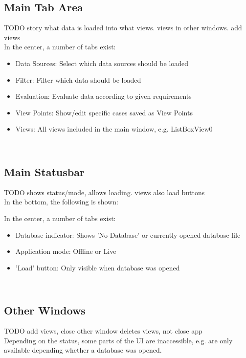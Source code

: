 \subsection{Main Tab Area}

TODO story what data is loaded into what views. views in other windows. add views \\

In the center, a number of tabs exist:
\begin{itemize}
 \item Data Sources: Select which data sources should be loaded
 \item Filter: Filter which data should be loaded
 \item Evaluation: Evaluate data according to given requirements
 \item View Points: Show/edit specific cases saved as View Points
 \item Views: All views included in the main window, e.g. ListBoxView0
\end{itemize}
\  \\

\subsection{Main Statusbar}

TODO shows status/mode, allows loading. views also load buttons \\

In the bottom, the following is shown:

In the center, a number of tabs exist:
\begin{itemize}
 \item Database indicator: Shows 'No Database' or currently opened database file
 \item Application mode: Offline or Live
 \item 'Load' button: Only visible when database was opened
\end{itemize}
\  \\

\subsection{Other Windows}

TODO add views, close other window deletes views, not close app \\

Depending on the status, some parts of the UI are inaccessible, e.g. are only available depending whether a database was opened.

